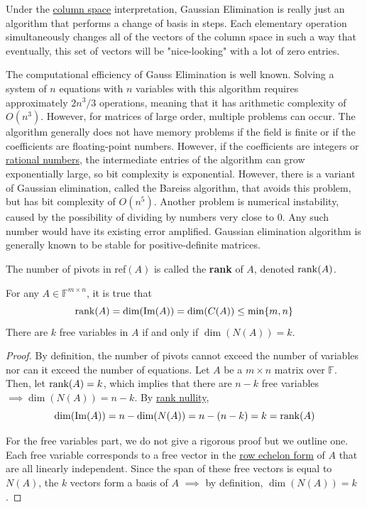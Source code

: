   Under the \hyperref[def:column-space]{column space} interpretation, Gaussian Elimination is really just an algorithm that performs a change of basis in steps. Each elementary operation simultaneously changes all of the vectors of the column space in such a way that eventually, this set of vectors will be "nice-looking" with a lot of zero entries. 

  The computational efficiency of Gauss Elimination is well known. Solving a system of $n$ equations with $n$ variables with this algorithm requires approximately $2 n^3 / 3$ operations, meaning that it has arithmetic complexity of $O(n^3)$. However, for matrices of large order, multiple problems can occur. The algorithm generally does not have memory problems if the field is finite or if the coefficients are floating-point numbers. However, if the coefficients are integers or \hyperref[alg-def:rational-numbers]{rational numbers}, the intermediate entries of the algorithm can grow exponentially large, so bit complexity is exponential. However, there is a variant of Gaussian elimination, called the Bareiss algorithm, that avoids this problem, but has bit complexity of $O(n^5)$. Another problem is numerical instability, caused by the possibility of dividing by numbers very close to $0$. Any such number would have its existing error amplified. Gaussian elimination algorithm is generally known to be stable for positive-definite matrices. 

  \begin{definition}[Rank]
    \label{def:rank-2}
    The number of pivots in ref$(A)$ is called the \textbf{rank} of $A$, denoted $\operatorname{rank}(A)$. 
  \end{definition}

	\begin{theorem}
	  \label{thm:rank-as-dimension-of-image}
		For any $A \in \mathbb{F}^{m \times n}$, it is true that 
		\begin{equation}
			\operatorname{rank}(A) = \dim(\operatorname{Im}(A)) = \dim(C(A)) \leq \min\{m, n\}
		\end{equation}
    There are $k$ free variables in $A$ if and only if $\dim(N(A)) = k$. 
  \end{theorem}
  \begin{proof}
    By definition, the number of pivots cannot exceed the number of variables nor can it exceed the number of equations. Let $A$ be a $m \times n$ matrix over $\mathbb{F}$. Then, let $\operatorname{rank}(A) = k$, which implies that there are $n-k$ free variables $\implies \dim(N(A)) = n - k$. By \hyperref[thm:rank-nullity-theorem]{rank nullity}, 
    \begin{equation}
      \dim(\operatorname{Im}(A)) = n - \dim(N(A)) = n - (n -k) = k = \operatorname{rank}(A)
    \end{equation}

    For the free variables part, we do not give a rigorous proof but we outline one. Each free variable corresponds to a free vector in the \hyperref[def:row-echelon-form]{row echelon form} of $A$ that are all linearly independent. Since the span of these free vectors is equal to $N(A)$, the $k$ vectors form a basis of $A$ $\implies$ by definition, $\dim(N(A)) = k$.
  \end{proof}

